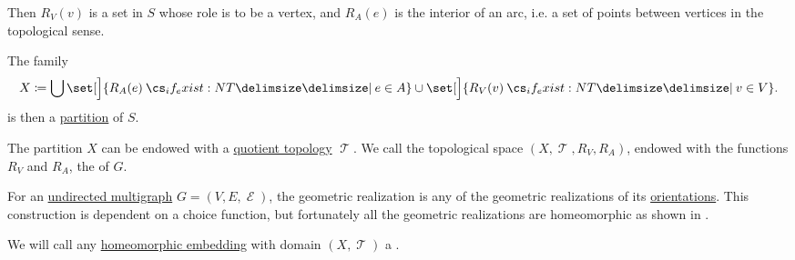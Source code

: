 \begin{definition}
  Then \( R_V(v) \) is a set in \( S \) whose role is to be a vertex, and \( R_A(e) \) is the interior of an arc, i.e. a set of points between vertices in the topological sense.

  The family
  \begin{equation*}
    X \coloneqq \bigcup \set[\Big]{ R_A(e) \given* e \in A } \cup \set[\Big]{ R_V(v) \given* v \in V }.
  \end{equation*}
  is then a \hyperref[def:set_partition]{partition} of \( S \).

  The partition \( X \) can be endowed with a \hyperref[def:topological_quotient]{quotient topology} \( \mscrT \). We call the topological space \( (X, \mscrT, R_V, R_A) \), endowed with the functions \( R_V \) and \( R_A \), the  of \( G \).

  \begin{thmenum}
     For an \hyperref[def:hypergraph/multigraph]{undirected multigraph} \( G = (V, E, \mscrE) \), the geometric realization is any of the geometric realizations of its \hyperref[def:multigraph_orientation]{orientations}. This construction is dependent on a choice function, but fortunately all the geometric realizations are homeomorphic as shown in .

     We will call any \hyperref[def:homeomorphism]{homeomorphic embedding} with domain \( (X, \mscrT) \) a .
  \end{thmenum}
\end{definition}


